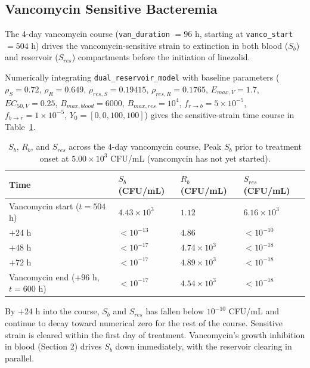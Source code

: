\documentclass[12pt, draftcls, onecolumn]{IEEEtran}
\begin{document}
\subsection{Vancomycin Sensitive Bacteremia}

The 4-day vancomycin course (\texttt{van\_duration} $= 96$ h, starting at \texttt{vanco\_start} $=
504$ h) drives the vancomycin-sensitive strain to extinction in
both blood ($S_b$) and reservoir ($S_{res}$) compartments before
the initiation of linezolid.

Numerically integrating \texttt{dual\_reservoir\_model} with baseline
parameters ($\rho_S = 0.72$, $\rho_R = 0.649$, $\rho_{res,S} = 0.19415$,
$\rho_{res,R} = 0.1765$, $E_{max,V} = 1.7$, $EC_{50,V} = 0.25$,
$B_{max,blood} = 6000$, $B_{max,res} = 10^4$, $f_{r\to b} = 5\times10^{-5}$,
$f_{b\to r} = 1\times10^{-5}$, $Y_0 = [0,0,100,100]$) gives the sensitive-strain
time course in Table~\ref{tab:sb}.

\begin{table}[H]
\centering
\large %
\renewcommand{\arraystretch}{1.35} %
\caption{$S_b$, $R_b$, and $S_{res}$ across the 4-day vancomycin course,
Peak $S_b$ prior
to treatment onset at $5.00\times10^{3}$ CFU/mL (vancomycin
has not yet started).}
\vspace{0.5cm} %
\begin{tabular}{l l l l}  %
\hline
\textbf{Time} & \textbf{$S_b$ (CFU/mL)} & \textbf{$R_b$ (CFU/mL)} & \textbf{$S_{res}$ (CFU/mL)} \\
\hline
Vancomycin start ($t=504$ h) & $4.43\times10^{3}$ & $1.12$ & $6.16\times10^{3}$ \\
$+24$ h & $<10^{-13}$ & $4.86$ & $<10^{-10}$ \\
$+48$ h & $<10^{-17}$ & $4.74\times10^{3}$ & $<10^{-18}$ \\
$+72$ h & $<10^{-17}$ & $4.89\times10^{3}$ & $<10^{-18}$ \\
Vancomycin end ($+96$ h, $t=600$ h) & $<10^{-17}$ & $4.54\times10^{3}$ & $<10^{-18}$ \\
\hline
\end{tabular}
\label{tab:sb}
\end{table}

By $+24$ h into the course, $S_b$ and $S_{res}$ has fallen below
$10^{-10}$ CFU/mL and
continue to decay toward numerical zero for the rest of the course. Sensitive strain is cleared  within the first day of treatment. Vancomycin's growth inhibition in
blood (Section 2) drives $S_b$ down immediately, with the reservoir clearing in parallel.
\end{document}
